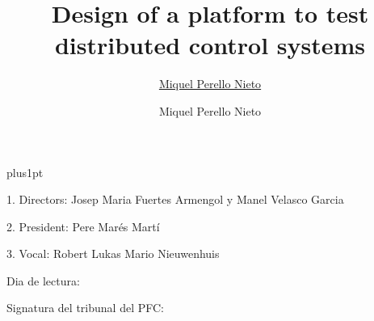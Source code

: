 \documentclass[twoside,11pt]{Latex/Classes/PhDthesisPSnPDF}
\title{Design of a platform to test distributed control systems}
\author{\href{mailto:miquel.perello.nieto@fib.upc.edu}{Miquel Perello Nieto}}
\author{Miquel Perello Nieto}
\begin{document}

\renewcommand\baselinestretch{1.2}
\baselineskip=18pt plus1pt



\maketitle  %



\newpage
\vspace{10mm}
1. Directors: Josep Maria Fuertes Armengol y Manel Velasco Garcia

\vspace{10mm}
2. President: Pere Marés Martí

\vspace{10mm}
3. Vocal: Robert Lukas Mario Nieuwenhuis

\vspace{20mm}
Dia de lectura:

\vspace{20mm}
\hspace{70mm}Signatura del tribunal del PFC:







%   



\frontmatter


\end{document}
